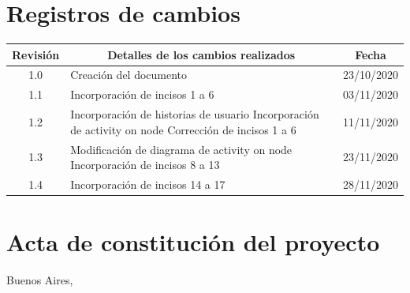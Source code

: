\documentclass[11pt]{charter}
\begin{document}
\maketitle
\thispagestyle{empty}
\pagebreak


\thispagestyle{empty}
{\setlength{\parskip}{0pt}
\tableofcontents{}
}
\pagebreak


\section{Registros de cambios}
\label{sec:registro}


\begin{table}[ht]
\label{tab:registro}
\centering
\begin{tabularx}{\linewidth}{@{}|c|X|c|@{}}
\hline
\rowcolor[HTML]{C0C0C0} 
Revisión & \multicolumn{1}{c|}{\cellcolor[HTML]{C0C0C0}Detalles de los cambios realizados} & Fecha      \\ \hline
1.0      & Creación del documento                                          & 23/10/2020 \\ \hline
1.1      & Incorporación de incisos 1 a 6                                  & 03/11/2020 \\ \hline
1.2      & Incorporación de historias de usuario \newline
		   Incorporación de activity on node \newline 									   
		   Corrección de incisos 1 a 6                           & 11/11/2020 \\ \hline
1.3		 & Modificación de diagrama de activity on node\newline
		   Incorporación de incisos 8 a 13						 & 23/11/2020  \\ \hline
1.4		 & Incorporación de incisos 14 a 17 					 & 28/11/2020 \\ \hline  
\end{tabularx}
\end{table}

\pagebreak



\section{Acta de constitución del proyecto}
\label{sec:acta}

\begin{flushright}
Buenos Aires, \fechaInicioName
\end{flushright}

\vspace{2cm}
\end{document}
